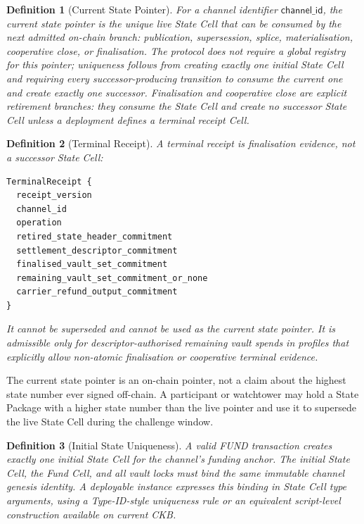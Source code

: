 \documentclass[a4paper,11pt]{article}
\newtheorem{definition}{Definition}
\begin{document}
\begin{definition}[Current State Pointer]
For a channel identifier $\mathsf{channel\_id}$, the current state pointer is the unique live State Cell that can be consumed by the next admitted on-chain branch: publication, supersession, splice, materialisation, cooperative close, or finalisation. The protocol does not require a global registry for this pointer; uniqueness follows from creating exactly one initial State Cell and requiring every successor-producing transition to consume the current one and create exactly one successor. Finalisation and cooperative close are explicit retirement branches: they consume the State Cell and create no successor State Cell unless a deployment defines a terminal receipt Cell.
\end{definition}

\begin{definition}[Terminal Receipt]
A terminal receipt is finalisation evidence, not a successor State Cell:
\begin{lstlisting}
TerminalReceipt {
  receipt_version
  channel_id
  operation
  retired_state_header_commitment
  settlement_descriptor_commitment
  finalised_vault_set_commitment
  remaining_vault_set_commitment_or_none
  carrier_refund_output_commitment
}
\end{lstlisting}
It cannot be superseded and cannot be used as the current state pointer. It is
admissible only for descriptor-authorised remaining vault spends in profiles
that explicitly allow non-atomic finalisation or cooperative terminal evidence.
\end{definition}

The current state pointer is an on-chain pointer, not a claim about the highest
state number ever signed off-chain. A participant or watchtower may hold a
State Package with a higher state number than the live pointer and use it to
supersede the live State Cell during the challenge window.

\begin{definition}[Initial State Uniqueness]
A valid \textsf{FUND} transaction creates exactly one initial State Cell for the channel's funding anchor. The initial State Cell, the Fund Cell, and all vault locks must bind the same immutable channel genesis identity. A deployable instance expresses this binding in State Cell type arguments, using a Type-ID-style uniqueness rule or an equivalent script-level construction available on current CKB.
\end{definition}
\end{document}
